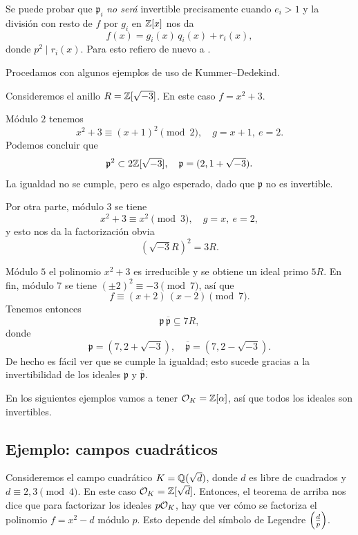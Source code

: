 \begin{comentario}
  Se puede probar que $\mathfrak{p}_i$ \emph{no será} invertible precisamente
  cuando $e_i > 1$ y la división con resto de $f$ por $g_i$ en $\mathbb{Z} [x]$ nos da
  $$f (x) = g_i (x) \, q_i (x) + r_i (x),$$
  donde $p^2 \mid r_i (x)$. Para esto refiero de nuevo a \cite{Stevenhagen-NR}.
\end{comentario}

Procedamos con algunos ejemplos de uso de Kummer--Dedekind.

\begin{ejemplo}
  Consideremos el anillo $R = \mathbb{Z} [\sqrt{-3}]$. En este caso $f = x^2 + 3$.

  Módulo $2$ tenemos
  $$x^2 + 3 \equiv (x+1)^2 \pmod{2}, \quad g = x+1, ~ e = 2.$$
  Podemos concluir que
  \[ \mathfrak{p}^2 \subset 2 \mathbb{Z} [\sqrt{-3}], \quad
     \mathfrak{p} = (2, 1 + \sqrt{-3}). \]
  La igualdad no se cumple, pero es algo esperado, dado que $\mathfrak{p}$
  no es invertible.

  Por otra parte, módulo $3$ se tiene
  $$x^2 + 3 \equiv x^2 \pmod{3}, \quad g = x, ~ e = 2,$$
  y esto nos da la factorización obvia
  $$(\sqrt{-3} R)^2 = 3R.$$

  Módulo $5$ el polinomio $x^2 + 3$ es irreducible y se obtiene un ideal primo
  $5 R$. En fin, módulo $7$ se tiene $(\pm 2)^2 \equiv -3 \pmod{7}$, así que
  $$f \equiv (x + 2)\,(x - 2) \pmod{7}.$$
  Tenemos entonces
  $$\mathfrak{p} \, \overline{\mathfrak{p}} \subseteq 7R,$$
  donde
  \[ \mathfrak{p} = (7, 2 + \sqrt{-3}), \quad
     \overline{\mathfrak{p}} = (7, 2 - \sqrt{-3}). \]
     De hecho es fácil ver que se cumple la igualdad; esto sucede gracias
     a la invertibilidad de los ideales $\mathfrak{p}$ y
     $\overline{\mathfrak{p}}$.
\end{ejemplo}

En los siguientes ejemplos vamos a tener $\mathcal{O}_K = \mathbb{Z} [\alpha]$, así que todos
los ideales son invertibles.

\subsection{Ejemplo: campos cuadráticos}

Consideremos el campo cuadrático $K = \mathbb{Q} (\sqrt{d})$, donde $d$ es libre de
cuadrados y $d \equiv 2,3\pmod{4}$. En este caso $\mathcal{O}_K = \mathbb{Z} [\sqrt{d}]$.
Entonces, el teorema de arriba nos dice que para factorizar los ideales
$p \mathcal{O}_K$, hay que ver cómo se factoriza el polinomio $f = x^2 - d$ módulo
$p$. Esto depende del símbolo de Legendre $\left(\frac{d}{p}\right)$.


